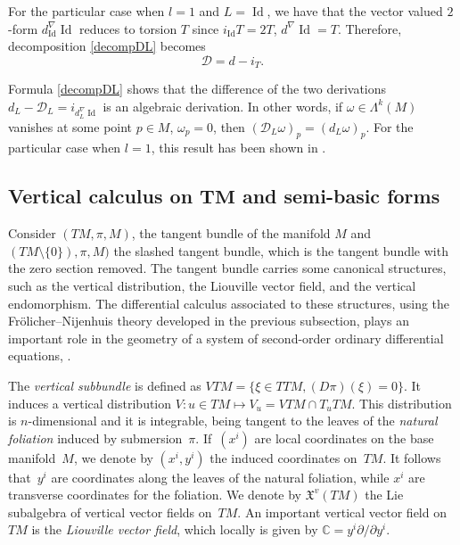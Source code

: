 For the particular case when $l=1$ and $L=\operatorname{Id}$, we have that
the vector valued $2$-form
$d_{\operatorname{Id}}^{\nabla}\operatorname{Id}$ reduces to
torsion $T$ since $i_{\operatorname{Id}}T=2T$,
$d^{\nabla}\operatorname{Id}=T$. Therefore, decomposition
\eqref{decompDL} becomes
\[ %
{\mathcal D}=d- i_T.
\]
\begin{Remark}
Formula \eqref{decompDL} shows that the dif\/ference of the two
derivations $d_L-{\mathcal
D}_L=i_{d^{\nabla}_L\operatorname{Id}}$ is an algebraic derivation.
In other words, if $\omega \in \Lambda^k(M)$ vanishes at some
point $p\in M$, $\omega_p=0$, then $({\mathcal
D}_L\omega)_p=(d_L\omega)_p$. For the particular case when $l=1$, this result has been
shown in \cite[Proposition~2.5]{grifone00}.
\end{Remark}



\subsection[Vertical calculus on $TM$ and semi-basic forms]{Vertical calculus on $\boldsymbol{TM}$ and semi-basic forms} \label{subsec:vcalc}

Consider $(TM, \pi, M)$, the tangent bundle of the manifold $M$
and $(TM\setminus\{0\}), \pi, M)$ the slashed tangent bundle, which is
the tangent bundle with the zero
section removed. The tangent bundle carries some canonical structures, such
as the vertical distribution, the Liouville vector f\/ield, and the
vertical endomorphism. The dif\/ferential calculus associated to
these structures, using the Fr\"olicher--Nijenhuis theory developed in
the previous subsection, plays an important role in the geometry of a
system of second-order ordinary dif\/ferential equations,
\cite{ bcd10, bucataru09, grifone72, grifone00, klein68, deleon89, miron94}.

The \emph{vertical subbundle} is def\/ined as $VTM=\{\xi \in TTM,
(D\pi)(\xi)=0\}$. It induces a vertical distribution $V: u\in TM
\mapsto V_u=VTM\cap T_uTM$. This distribution is $n$-dimensional
and it is integrable, being tangent to the leaves of the \emph{natural
foliation} induced by submersion~$\pi$. If~$(x^i)$ are local coordinates on the base
manifold~$M$, we denote by $(x^i, y^i)$ the induced coordinates on~$TM$. It follows that~$y^i$ are coordinates along the leaves of the
natural foliation, while $x^i$ are transverse coordinates for the
foliation. We denote by ${\mathfrak X}^v(TM)$ the Lie subalgebra of vertical vector f\/ields on~$TM$. An
important vertical vector f\/ield on $TM$ is the \emph{Liouville vector
field}, which locally is given by
$\mathbb{C}=y^i{\partial}/{\partial y^i}.$


